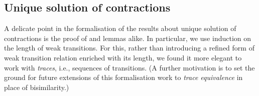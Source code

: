 \documentclass[GCNS]{yincog}
\theoremstyle{remark}
\theoremstyle{theorem}
\theoremstyle{remark}
\begin{document}
\subsection{Unique solution of contractions}
 \label{sec4.11}

A delicate point in the formalisation of the results about unique solution
of contractions is the proof of  and lemmas alike.
In particular, we use induction on the length of weak transitions. For
this, rather than introducing a refined form of weak transition relation
enriched with its length, we found it more elegant to work with
\emph{traces}, i.e., sequences of transitions. (A further motivation is
to set the ground for future extensions of this formalisation work to
\emph{trace equivalence} in place of bisimilarity.)
\end{document}
